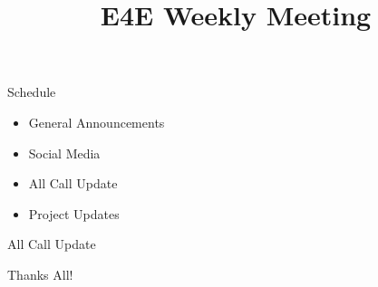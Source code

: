 \documentclass[aspectratio=169]{beamer}
\title{E4E Weekly Meeting}
\institute{UC San Diego}
\begin{document}
\maketitle
\begin{frame}{Schedule}
    \begin{itemize}
        \item General Announcements
        \item Social Media
        \item All Call Update
              \begin{enumerate}
                  
              \end{enumerate}
        \item Project Updates
              \begin{enumerate}
                  
              \end{enumerate}
    \end{itemize}
\end{frame}


\begin{frame}{All Call Update}
    \begin{enumerate}
        
    \end{enumerate}
\end{frame}


\begin{frame}
    \centering
    Thanks All!
\end{frame}
\end{document}

